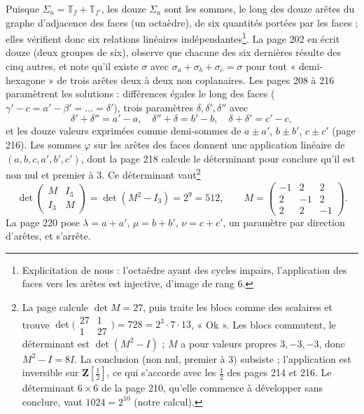 \documentclass[11pt,a4paper]{article}
\begin{document}
Puisque $\Sigma_a = \mathbb{T}_f + \mathbb{T}_{f'}$, les douze $\Sigma_a$ sont les
sommes, le long des douze arêtes du graphe d'adjacence des faces (un
octaèdre), de six quantités portées par les faces ; elles vérifient donc six
relations linéaires indépendantes\footnote{Explicitation de nous : l'octaèdre
ayant des cycles impairs, l'application des faces vers les arêtes est
injective, d'image de rang $6$.}. La page 202 en écrit douze (deux groupes de
six), observe que chacune des six dernières résulte des cinq autres, et note
qu'il existe $\sigma$ avec $\sigma_a + \sigma_b + \sigma_c = \sigma$ pour tout
« demi-hexagone » de trois arêtes deux à deux non coplanaires. Les pages 208 à
216 paramètrent les solutions : différences égales le long des faces
($\gamma' - c = a' - \beta' = \ldots = \delta'$), trois paramètres $\delta,
\delta', \delta''$ avec
\[
  \delta' + \delta'' = a' - a,\quad \delta'' + \delta = b' - b,\quad \delta +
  \delta' = c' - c,
\]
et les douze valeurs exprimées comme demi-sommes de $a \pm a'$, $b \pm b'$, $c
\pm c'$ (page 216). Les sommes $\varphi$ sur les arêtes des faces donnent une
application linéaire de $(a, b, c, a', b', c')$, dont la page 218 calcule le
déterminant pour conclure qu'il est non nul et premier à $3$. Ce déterminant
vaut\footnote{La page calcule $\det M = 27$, puis traite les blocs comme des
scalaires et trouve $\det\bigl(\begin{smallmatrix} 27 & 1 \\ 1 &
27\end{smallmatrix}\bigr) = 728 = 2^3\cdot 7\cdot 13$, « Ok ». Les blocs commutent,
le déterminant est $\det(M^2 - I)$ ; $M$ a pour valeurs propres $3, -3, -3$, donc
$M^2 - I = 8I$. La conclusion (non nul, premier à $3$) subsiste ; l'application
est inversible sur $\mathbf{Z}[\frac12]$, ce qui s'accorde avec les $\frac12$ des
pages 214 et 216. Le déterminant $6 \times 6$ de la page 210, qu'elle commence à
développer sans conclure, vaut $1024 = 2^{10}$ (notre calcul).}
\[
  \det\begin{pmatrix} M & I_3 \\ I_3 & M\end{pmatrix} = \det(M^2 - I_3) = 2^9 = 512,
  \qquad M = \begin{pmatrix} -1 & 2 & 2 \\ 2 & -1 & 2 \\ 2 & 2 & -1\end{pmatrix}.
\]
La page 220 pose
$\lambda = a + a'$, $\mu = b + b'$, $\nu = c + c'$, un paramètre par direction
d'arêtes, et s'arrête.
\end{document}
